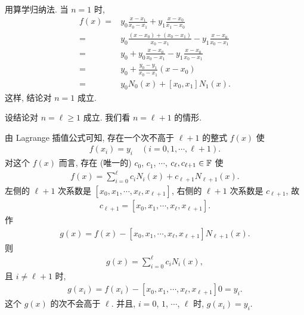 \begin{pf}
    用算学归纳法. 当 $n=1$ 时,
    \begin{align*}
        f(x)
        = {} & y_0 \frac{x - x_1}{x_0 - x_1}
        + y_1 \frac{x - x_0}{x_1 - x_0}                      \\
        = {} & y_0 \frac{(x - x_0) + (x_0 - x_1)}{x_0 - x_1}
        - y_1 \frac{x - x_0}{x_0 - x_1}                      \\
        = {} & y_0 + y_0 \frac{x - x_0}{x_0 - x_1}
        - y_1 \frac{x - x_0}{x_0 - x_1}                      \\
        = {} & y_0 + \frac{y_0 - y_1}{x_0 - x_1} (x - x_0)   \\
        = {} & y_0 N_0 (x) + [x_0, x_1] N_1 (x).
    \end{align*}
    这样, 结论对 $n=1$ 成立.

    设结论对 $n = \ell \geq 1$ 成立. 我们看 $n = \ell + 1$ 的情形.

    由 Lagrange 插值公式可知, 存在一个次不高于 $\ell + 1$ 的整式 $f(x)$ 使
    \begin{align*}
        f(x_i) = y_i \quad (i = 0,1,\cdots,\ell + 1).
    \end{align*}
    对这个 $f(x)$ 而言, 存在 (唯一的) $c_0$, $c_1$, $\cdots$, $c_{\ell}, c_{\ell + 1} \in \mathbb{F}$ 使
    \begin{align*}
        f(x) = \sum_{i = 0}^{\ell} c_i N_{i} (x) + c_{\ell + 1} N_{\ell + 1} (x).
    \end{align*}
    左侧的 $\ell + 1$ 次系数是 $[x_0, x_1, \cdots, x_\ell, x_{\ell + 1}]$, 右侧的 $\ell + 1$ 次系数是 $c_{\ell + 1}$, 故
    \begin{align*}
        c_{\ell + 1} = [x_0, x_1, \cdots, x_\ell, x_{\ell + 1}].
    \end{align*}
    作
    \begin{align*}
        g(x) = f(x) - [x_0, x_1, \cdots, x_\ell, x_{\ell + 1}] N_{\ell + 1} (x).
    \end{align*}
    则
    \begin{align*}
        g(x) = \sum_{i = 0}^{\ell} c_i N_{i} (x),
    \end{align*}
    且 $i \neq \ell + 1$ 时,
    \begin{align*}
        g(x_i) = f(x_i) - [x_0, x_1, \cdots, x_\ell, x_{\ell + 1}] 0 = y_i.
    \end{align*}
    这个 $g(x)$ 的次不会高于 $\ell$. 并且, $i = 0$, $1$, $\cdots$, $\ell$ 时, $g(x_i) = y_i$.


\end{pf}
